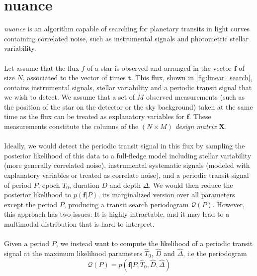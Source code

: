 \documentclass[modern]{aastex631}
\begin{document}
\newpage
\section{\textsf{nuance}}\label{nuance}

\textit{nuance} is an algorithm capable of searching for planetary transits in light curves containing correlated noise, such as instrumental signals and photometric stellar variability.
\\\\
Let assume that the flux $f$ of a star is observed and arranged in the vector $\bm{f}$ of size $N$, associated to the vector of times $\bm{t}$. This flux, shown in \autoref{fig:linear_search}, contains instrumental signals, stellar variability and a periodic transit signal that we wish to detect. We assume that a set of $M$ observed measurements (such as the position of the star on the detector or the sky background) taken at the same time as the flux can be treated as explanatory variables for $\bm{f}$. These measurements constitute the columns of the $(N\times M)$ \textit{design matrix} $\bm{X}$.\\\\
Ideally, we would detect the periodic transit signal in this flux by sampling the posterior likelihood of this data to a full-fledge model including stellar variability (more generally correlated noise), instrumental systematic signals (modeled with explanatory variables or treated as correlate noise), and a periodic transit signal of period $P$, epoch $T_0$, duration $D$ and depth $\Delta$. We would then reduce the posterior likelihood to $p(\bm{f}\vert P)$, its marginalized version over all parameters except the period $P$, producing a transit search periodogram $\mathcal{Q}(P)$. However, this approach has two issues: It is highly intractable, and it may lead to a multimodal distribution that is hard to interpret.
\\\\
Given a period $P$, we instead want to compute the likelihood of a periodic transit signal at the maximum likelihood parameters $\hat T_0$, $\hat D$ and $\hat \Delta$, i.e the periodogram
\begin{equation}\label{eq:periodogram}
        \mathcal{Q}(P) = p(\bm{f} \vert P, \hat T_0 ,\hat D, \hat \Delta)
\end{equation}
\end{document}
